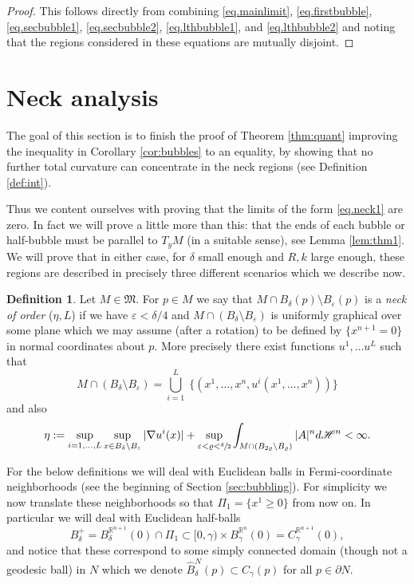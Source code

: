 \documentclass[JEP,XML,SOM,Unicode]{cedram}
\newcounter{cas}
\theoremstyle{definition}
\newtheorem{definition}[thm]{Definition}
\newcommand{\R}{\mathbb{R}}
\newcommand{\h}{\mathscr{H}}
\let\D\nabla
\let\eps\varepsilon
\begin{document}
\begin{proof}
This follows directly from combining \eqref{eq.mainlimit}, \eqref{eq.firstbubble}, \eqref{eq.secbubble1}, \eqref{eq.secbubble2}, \eqref{eq.lthbubble1}, and \eqref{eq.lthbubble2} and noting that the regions considered in these equations are mutually disjoint.
\end{proof}

\section{Neck analysis}\label{sec:neck}

The goal of this section is to finish the proof of Theorem \ref{thm:quant} improving the inequality in Corollary \ref{cor:bubbles} to an equality, by showing that no further total curvature can concentrate in the neck regions (see Definition \ref{def:int}).

Thus we content ourselves with proving that the limits of the form \eqref{eq.neck1} are zero. In fact we will prove a little more than this: that the ends of each bubble or half-bubble must be parallel to $T_y M$ (in a suitable sense), see Lemma \ref{lem:thm1}. We will prove that in either case, for $\delta$ small enough and $R,k$ large enough, these regions are described in precisely three different scenarios which we describe now.

\begin{definition}\label{neckdef}
Let $M\in \mathfrak{M}$. For $p\in M$ we say that $M\cap B_\delta(p)\setminus B_{\eps}(p)$ is a \emph{neck of order} ($\eta, L$) if we have $\eps < \delta/4$ and $M\cap (B_\delta\setminus B_{\eps})$ is uniformly graphical over some plane which we may assume (after a rotation) to be defined by $\{x^{n+1}=0\}$ in normal coordinates about $p$. More precisely there exist functions $u^1,\dots u^L$ such that
\begin{equation*}
M\cap (B_\delta \setminus B_{\eps}) = \bigcup_{i=1}^L \; \{(x^1,\dots , x^n, u^i(x^1,\dots, x^n))\}
\end{equation*}
and also
\begin{equation}
\eta:=\sup_{i=1,\ldots,L} \sup_{x\in B_\delta \setminus B_{\eps}} |\D u^i (x)| + \sup_{\eps< \varrho < \sfrac{\delta}{2}} \int_{M \cap (B_{2\varrho}\setminus B_\varrho)} |A|^n d\h^n < \infty.
\end{equation}
\end{definition}

For the below definitions we will deal with Euclidean balls in Fermi-coordinate neighborhoods (see the beginning of Section \ref{sec:bubbling}). For simplicity we now translate these neighborhoods so that $\Pi_1 = \{x^1 \geq 0\}$ from now on. In particular we will deal with Euclidean half-balls
$$B_\delta^+=B^{\R^{n+1}}_\delta (0)\cap \Pi_1\subset [0,\gamma)\times B^{\R^n}_{\gamma}(0)=C^{\R^{n+1}}_\gamma(0),$$ and notice that these correspond to some simply connected domain (though not a geodesic ball) in $N$ which we denote $\widehat{B}^N_\delta(p)\subset C_{\gamma}(p)$ for all $p\in \partial N$.
\end{document}
